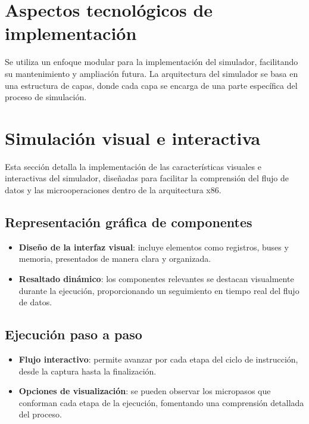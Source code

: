 \documentclass[12pt,oneside]{templates/unerthesis}
\providecommand{\tightlist}{%
  \setlength{\itemsep}{0pt}\setlength{\parskip}{0pt}}
\begin{document}
\hypertarget{aspectos-tecnoluxf3gicos-de-implementaciuxf3n}{%
\section{Aspectos tecnológicos de implementación}\label{aspectos-tecnoluxf3gicos-de-implementaciuxf3n}}

Se utiliza un enfoque modular para la implementación del simulador, facilitando su mantenimiento y ampliación futura. La arquitectura del simulador se basa en una estructura de capas, donde cada capa se encarga de una parte específica del proceso de simulación.

\hypertarget{simulaciuxf3n-visual-e-interactiva}{%
\section{Simulación visual e interactiva}\label{simulaciuxf3n-visual-e-interactiva}}

Esta sección detalla la implementación de las características visuales e interactivas del simulador, diseñadas para facilitar la comprensión del flujo de datos y las microoperaciones dentro de la arquitectura x86.

\hypertarget{representaciuxf3n-gruxe1fica-de-componentes}{%
\subsection{Representación gráfica de componentes}\label{representaciuxf3n-gruxe1fica-de-componentes}}

\begin{itemize}
\tightlist
\item
  \textbf{Diseño de la interfaz visual}: incluye elementos como registros, buses y memoria, presentados de manera clara y organizada.
\item
  \textbf{Resaltado dinámico}: los componentes relevantes se destacan visualmente durante la ejecución, proporcionando un seguimiento en tiempo real del flujo de datos.
\end{itemize}

\hypertarget{ejecuciuxf3n-paso-a-paso}{%
\subsection{Ejecución paso a paso}\label{ejecuciuxf3n-paso-a-paso}}

\begin{itemize}
\tightlist
\item
  \textbf{Flujo interactivo}: permite avanzar por cada etapa del ciclo de instrucción, desde la captura hasta la finalización.
\item
  \textbf{Opciones de visualización}: se pueden observar los micropasos que conforman cada etapa de la ejecución, fomentando una comprensión detallada del proceso.
\end{itemize}
\end{document}
